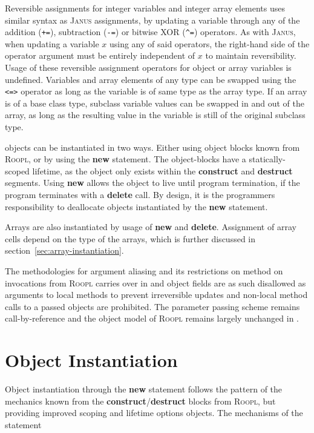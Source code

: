 Reversible assignments for integer variables and integer array elements uses similar syntax as \textsc{Janus} assignments, by updating a variable through any of the addition (\texttt{+=}), subtraction (\texttt{-=}) or bitwise XOR (\texttt{\^{}=}) operators. As with \textsc{Janus}, when updating a variable $x$ using any of said operators, the right-hand side of the operator argument must be entirely independent of $x$ to maintain reversibility. Usage of these reversible assignment operators for object or array variables is undefined. Variables and array elements of any type can be swapped using the \texttt{<=>} operator as long as the variable is of same type as the array type. If an array is of a base class type, subclass variable values can be swapped in and out of the array, as long as the resulting value in the variable is still of the original subclass type.  

\rooplpp objects can be instantiated in two ways. Either using object blocks known from \textsc{Roopl}, or by using the \textbf{new} statement. The object-blocks have a statically-scoped lifetime, as the object only exists within the \textbf{construct} and \textbf{destruct} segments. Using \textbf{new} allows the object to live until program termination, if the program terminates with a \textbf{delete} call. By design, it is the programmers responsibility to deallocate objects instantiated by the \textbf{new} statement.

Arrays are also instantiated by usage of \textbf{new} and \textbf{delete}. Assignment of array cells depend on the type of the arrays, which is further discussed in section~\ref{sec:array-instantiation}.

The methodologies for argument aliasing and its restrictions on method on invocations from \textsc{Roopl} carries over in \rooplpp and object fields are as such disallowed as arguments to local methods to prevent irreversible updates and non-local method calls to a passed objects are prohibited. The parameter passing scheme remains call-by-reference and the object model of \textsc{Roopl} remains largely unchanged in \rooplpp.

\section{Object Instantiation}
\label{sec:object-instantiation}
Object instantiation through the \textbf{new} statement follows the pattern of the mechanics known from the \textbf{construct}/\textbf{destruct} blocks from \textsc{Roopl}, but providing improved scoping and lifetime options objects. The mechanisms of the statement 

